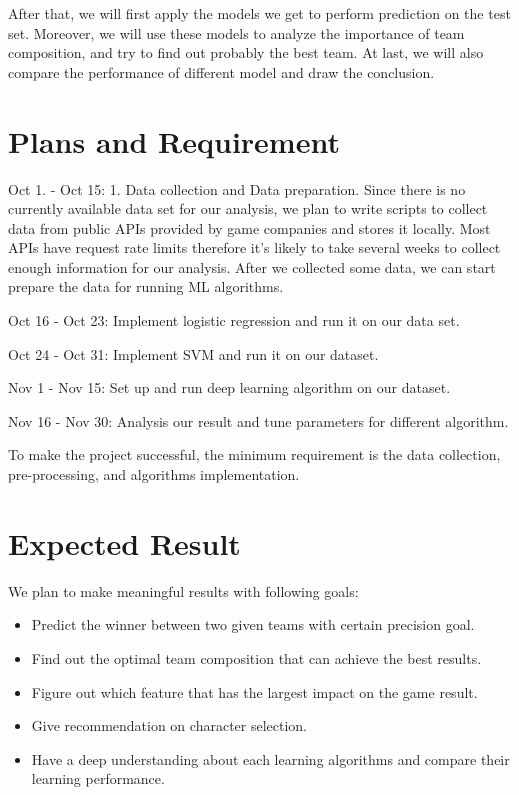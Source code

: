 \documentclass[conference]{IEEEtran}
\begin{document}
After that, we will first apply the models we get to perform prediction on the test set. Moreover, we will use these models to analyze the importance of team composition, and try to find out probably the best team. At last, we will also compare the performance of different model and draw the conclusion.


\section{Plans and Requirement}

Oct 1. - Oct 15: 1. Data collection and Data preparation. Since there is no currently available  data set for our analysis, we plan to write scripts to collect data from public APIs provided by game companies and stores it locally. Most APIs have request rate limits therefore it's likely to take several weeks to collect enough information for our analysis. After we collected some data, we can start prepare the data for running ML algorithms.

Oct 16 -  Oct 23: Implement logistic regression and run it on our data set.

Oct 24 - Oct 31: Implement SVM and run it on our dataset.

Nov 1 - Nov 15: Set up and run deep learning algorithm on our dataset.

Nov 16 - Nov 30: Analysis our result and tune parameters for different algorithm.

To make the project successful, the minimum requirement is the data collection, pre-processing, and algorithms implementation.

\section{Expected Result}
We plan to make meaningful results with following goals:

\begin{itemize}
  \item Predict the winner between two given teams with certain precision goal.
  \item Find out the optimal team composition that can achieve the best results.
  \item Figure out which feature that has the largest impact on the game result.
  \item Give recommendation on character selection.
  \item Have a deep understanding about each learning algorithms and compare their learning performance.
\end{itemize}
\end{document}
